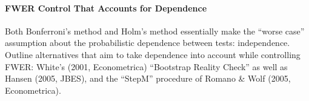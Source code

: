 \paragraph{FWER Control That Accounts for Dependence} Both Bonferroni's method and Holm's method essentially make the ``worse case'' assumption about the probabilistic dependence between tests: independence.
Outline alternatives that aim to take dependence into account while controlling FWER: White's (2001, Econometrica) ``Bootstrap Reality Check'' as well as Hansen (2005, JBES), and the ``StepM'' procedure of Romano \& Wolf (2005, Econometrica).

